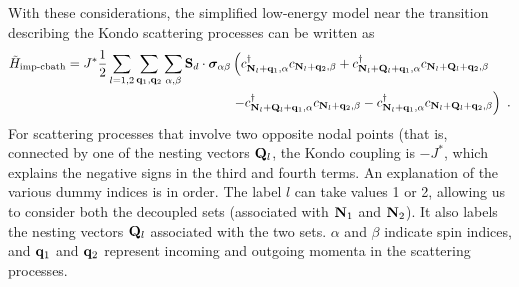 \documentclass[reprint,hidelinks,onecolumn]{revtex4-2}
\begin{document}
With these considerations, the simplified low-energy model near the transition describing the Kondo scattering processes can be written as
\begin{equation}\begin{aligned}
	\tilde H_\text{imp-cbath} = J^*\frac{1}{2}\sum_{l=1,2}\sum_{{\bf q}_1, {\bf q}_2}\sum_{\alpha,\beta}{\bf S}_d\cdot{\boldsymbol \sigma}_{\alpha\beta}&\left(c^\dagger_{{\bf N}_l + {\bf q}_1,\alpha}c_{{\bf N}_l + {\bf q}_2,\beta} + c^\dagger_{{\bf N}_l + {\bf Q}_l + {\bf q}_1,\alpha}c_{{\bf N}_l + {\bf Q}_l + {\bf q}_2,\beta} \right. \\
&\left. - c^\dagger_{{\bf N}_l + {\bf Q}_l + {\bf q}_1,\alpha}c_{{\bf N}_l + {\bf q}_2,\beta} - c^\dagger_{{\bf N}_l + {\bf q}_1,\alpha}c_{{\bf N}_l + {\bf Q}_l + {\bf q}_2,\beta}\right)~.
\end{aligned}\end{equation}
For scattering processes that involve two opposite nodal points (that is, connected by one of the nesting vectors \({\bf Q}_l\), the Kondo coupling is \(-J^*\), which explains the negative signs in the third and fourth terms. An explanation of the various dummy indices is in order. The label \(l\) can take values 1 or 2, allowing us to consider both the decoupled sets (associated with \({\bf N}_1\) and \({\bf N}_2\)). It also labels the nesting vectors \({\bf Q}_l\) associated with the two sets. \(\alpha\) and \(\beta\) indicate spin indices, and \({\bf q}_1\) and \({\bf q}_2\) represent incoming and outgoing momenta in the scattering processes.
\end{document}
